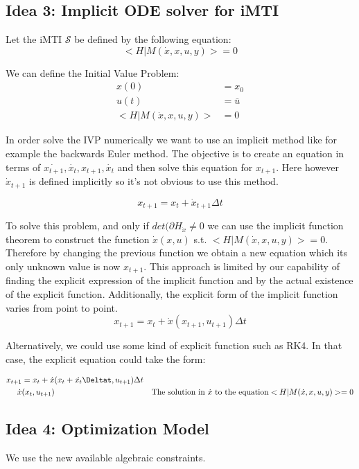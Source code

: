 \documentclass{article}
\begin{document}
\subsection{Idea 3: Implicit ODE solver for iMTI}

Let the iMTI $\mathcal{S}$  be defined by the following equation:
\begin{equation}
    <H|M(\dot{x},x,u,y)> = 0
\end{equation}

We can define the Initial Value Problem:
\begin{align}
    x(0) &= x_0 \\
    u(t) &= \overline{u} \\ 
    <H|M(\dot{x},x,u,y)> &= 0
\end{align}

In order solve the IVP numerically we want to use an implicit method like for example the backwards Euler method. The objective is to create an equation in terms of $\dot{x_{t+1}},\dot{x_{t}}, x_{t+1}, \dot{x_{t}}$ and then solve this equation for $x_{t+1}$. Here however $ \dot{x}_{t+1}$ is defined implicitly so it's not obvious to use this method.

\begin{equation}
    x_{t+1} = x_t + \dot{x}_{t+1} \Delta t
\end{equation}

To solve this problem, and only if $det(\partial H_{\dot{x}} \neq 0 $ we can use the implicit function theorem to construct the function $\dot{x}(x,u)$ s.t. $<H|M(\dot{x},x,u,y)> =0$. Therefore by changing the previous function we obtain a new equation which its only unknown value is now $x_{t+1}$. This approach is limited by our capability of finding the explicit expression of the implicit function and by the actual existence of the explicit function. Additionally, the explicit form of the implicit function varies from point to point.  
\begin{equation}
    x_{t+1} = x_t + \dot{x}(x_{t+1}, u_{t+1}) \Delta t
\end{equation}

Alternatively, we could use some kind of explicit function such as RK4. In that case, the explicit equation could take the form:

\begin{align}
    x_{t+1} &= x_t + \dot{x}(x_{t} + \dot{x_t}\Deltat, u_{t+1}) \Delta t \\
    \dot{x}&(x_{t}, u_{t+1}) \ & \text{The solution in $\dot{x}$  to the equation} <H|M(\dot{x},x,u,y)> = 0
\end{align}

\subsection{Idea 4: Optimization Model}

We use the new available algebraic constraints. 


\end{document}

